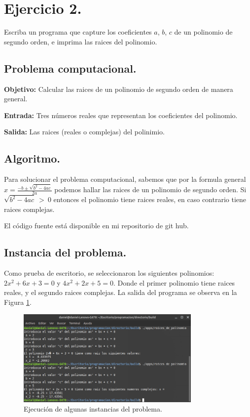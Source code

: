 \documentclass[12pt,letterpaper]{article}
\begin{document}
\section{Ejercicio 2.}

Escriba un programa que capture los coeficientes $a$, $b$, $c$ de un polinomio de segundo orden, e imprima las raices del polinomio.

\subsection{Problema computacional.}
\textbf{Objetivo:} Calcular las raices de un polinomio de segundo orden de manera general.

\textbf{Entrada:} Tres n\'umeros reales que representan los coeficientes del polinomio.

\textbf{Salida:} Las raices (reales o complejas) del polinimio.

\subsection{Algoritmo.}
Para solucionar el problema computacional, sabemos que por la formula general $ x = \frac{-b \pm \sqrt{b^2 - 4ac}}{2a} $ podemos hallar las raices de un polinomio de segundo orden. Si $\sqrt{b^2 - 4ac} \ > \ 0$ entonces el polinomio tiene raices reales, en caso contrario tiene raices complejas.


El código fuente está disponible en mi repositorio de git hub. \cite{url:raices_de_polinomio}

\subsection{Instancia del problema.}
Como prueba de escritorio, se seleccionaron los siguientes polinomios: $  2x^2+6x+3=0$ y $4x^2+2x+5=0$. Donde el primer polinomio tiene raices reales, y el segundo raices complejas. La salida del programa se observa en la Figura \ref{fig:raices_de_polinomio}.
\begin{figure}[ht!]
  \centering
  \includegraphics[width=0.8\textwidth]{figures/raices_de_polinomio}
  \caption{Ejecución de algunas instancias del problema.}
  \label{fig:raices_de_polinomio}
\end{figure}
\end{document}
